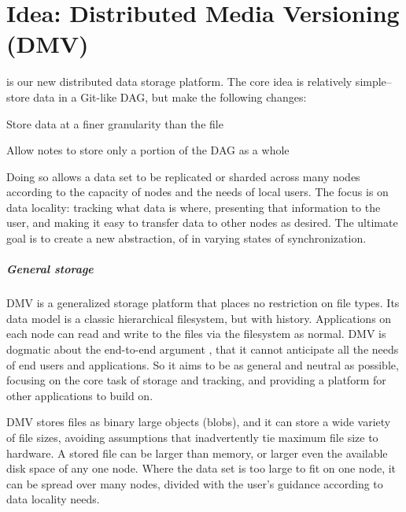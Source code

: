 \chapter{Idea: Distributed Media Versioning (DMV)}

 is our new distributed data storage
platform. The core idea is relatively simple-- store data in a Git-like DAG, but
make the following changes:

\begin{tight_enumerate}

    \item{Store data at a finer granularity than the file}

    \item{Allow notes to store only a portion of the DAG as a whole}

\end{tight_enumerate}

Doing so allows a data set to be replicated or sharded across many nodes
according to the capacity of nodes and the needs of local users. The focus is on
data locality: tracking what data is where, presenting that information to the
user, and making it easy to transfer data to other nodes as desired. The
ultimate goal is to create a new abstraction, of  in varying states of synchronization.


\paragraph{General storage}

DMV is a generalized storage platform that places no restriction on file types.
Its data model is a classic hierarchical filesystem, but with history.
Applications on each node can read and write to the files via the filesystem as
normal. DMV is dogmatic about the end-to-end argument \cite{endtoendargument},
that it cannot anticipate all the needs of end users and applications. So it
aims to be as general and neutral as possible, focusing on the core task of
storage and tracking, and providing a platform for other applications to build
on.

DMV stores files as binary large objects (\glspl{blob}), and it can store a wide
variety of file sizes, avoiding assumptions that inadvertently tie maximum file
size to hardware. A stored file can be larger than memory, or larger even the
available disk space of any one node. Where the data set is too large to fit on
one node, it can be spread over many nodes, divided with the user's guidance
according to data locality needs.

